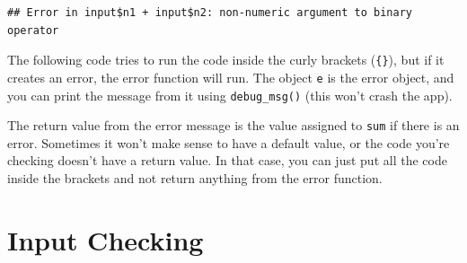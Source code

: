 \documentclass[
  oneside]{book}
\newenvironment{Shaded}{\begin{snugshade}}{\end{snugshade}}
\newcommand{\AttributeTok}[1]{\textcolor[rgb]{0.77,0.63,0.00}{#1}}
\newcommand{\ControlFlowTok}[1]{\textcolor[rgb]{0.13,0.29,0.53}{\textbf{#1}}}
\newcommand{\DecValTok}[1]{\textcolor[rgb]{0.00,0.00,0.81}{#1}}
\newcommand{\FunctionTok}[1]{\textcolor[rgb]{0.00,0.00,0.00}{#1}}
\newcommand{\NormalTok}[1]{#1}
\newcommand{\OtherTok}[1]{\textcolor[rgb]{0.56,0.35,0.01}{#1}}
\newcommand{\SpecialCharTok}[1]{\textcolor[rgb]{0.00,0.00,0.00}{#1}}
\begin{document}
\begin{verbatim}
## Error in input$n1 + input$n2: non-numeric argument to binary operator
\end{verbatim}

The following code tries to run the code inside the curly brackets (\texttt{\{\}}), but if it creates an error, the error function will run. The object \texttt{e} is the error object, and you can print the message from it using \texttt{debug\_msg}\texttt{()} (this won't crash the app).

\begin{Shaded}
\end{Shaded}

The return value from the error message is the value assigned to \texttt{sum} if there is an error. Sometimes it won't make sense to have a default value, or the code you're checking doesn't have a return value. In that case, you can just put all the code inside the brackets and not return anything from the error function.

\begin{Shaded}
\end{Shaded}

\hypertarget{input-checking}{%
\section{Input Checking}\label{input-checking}}
\end{document}
